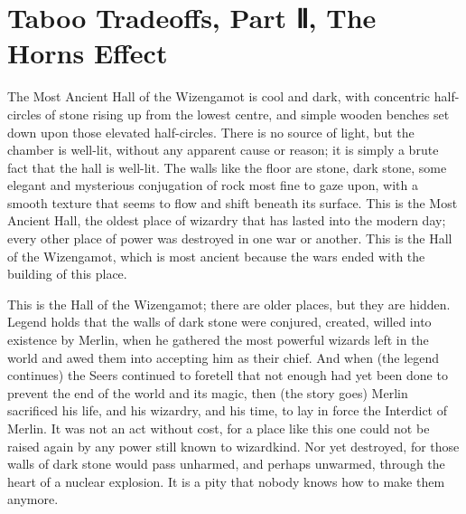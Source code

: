 \chapter{Taboo Tradeoffs, Part Ⅱ, The Horns
Effect}\label{taboo-tradeoffs-part-the-horns-effect}

The Most Ancient Hall of the Wizengamot is cool and dark, with
concentric half-circles of stone rising up from the lowest centre, and
simple wooden benches set down upon those elevated half-circles. There
is no source of light, but the chamber is well-lit, without any apparent
cause or reason; it is simply a brute fact that the hall is well-lit.
The walls like the floor are stone, dark stone, some elegant and
mysterious conjugation of rock most fine to gaze upon, with a smooth
texture that seems to flow and shift beneath its surface. This is the
Most Ancient Hall, the oldest place of wizardry that has lasted into the
modern day; every other place of power was destroyed in one war or
another. This is the Hall of the Wizengamot, which is most ancient
because the wars ended with the building of this place.

This is the Hall of the Wizengamot; there are older places, but they are
hidden. Legend holds that the walls of dark stone were conjured,
created, willed into existence by Merlin, when he gathered the most
powerful wizards left in the world and awed them into accepting him as
their chief. And when (the legend continues) the Seers continued to
foretell that not enough had yet been done to prevent the end of the
world and its magic, then (the story goes) Merlin sacrificed his life,
and his wizardry, and his time, to lay in force the Interdict of Merlin.
It was not an act without cost, for a place like this one could not be
raised again by any power still known to wizardkind. Nor yet destroyed,
for those walls of dark stone would pass unharmed, and perhaps unwarmed,
through the heart of a nuclear explosion. It is a pity that nobody knows
how to make them anymore.

